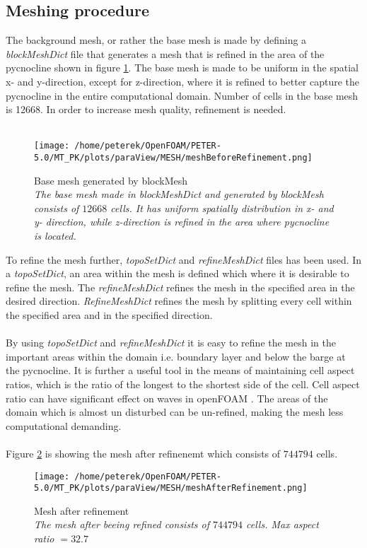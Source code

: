 \documentclass[a4paper, 12pt]{report}
\begin{document}
\subsection{Meshing procedure}
The background mesh, or rather the base mesh is made by defining a \textit{blockMeshDict} file that generates a mesh that is refined in the area of the pycnocline shown in figure \ref{fig:baseMesh}. The base mesh is made to be uniform in the spatial x- and y-direction, except for z-direction, where it is refined to better capture the pycnocline in the entire computational domain. Number of cells in the base mesh is 12668. In order to increase mesh quality, refinement is needed.\\
\\
\begin{figure}[H]
	\centering
	\texttt{[image: /home/peterek/OpenFOAM/PETER-5.0/MT\_PK/plots/paraView/MESH/meshBeforeRefinement.png]}
	\caption{Base mesh generated by blockMesh\\ \textit{The base mesh made in blockMeshDict and generated by blockMesh consists of $12668$ cells. It has uniform spatially distribution in x- and y- direction, while z-direction is refined in the area where pycnocline is located.}}
	\label{fig:baseMesh}
\end{figure}

To refine the mesh further, \textit{topoSetDict} and \textit{refineMeshDict} files has been used. In a \textit{topoSetDict}, an area within the mesh is defined which where it is desirable to refine the mesh. The \textit{refineMeshDict} refines the mesh in the specified area in the desired direction. \textit{RefineMeshDict} refines the mesh by splitting every cell within the specified area and in the specified direction.\\
\\
By using \textit{topoSetDict} and \textit{refineMeshDict} it is easy to refine the mesh in the important areas within the domain i.e. boundary layer and below the barge at the pycnocline. It is further a useful tool in the means of maintaining cell aspect ratios, which is the ratio of the longest to the shortest side of the cell. Cell aspect ratio can have significant effect on waves in openFOAM \cite{Roenby}. The areas of the domain which is almost un disturbed can be un-refined, making the mesh less computational demanding.\\
\\
Figure \ref{fig:RefinedMesh} is showing the mesh after refinenemt which consists of $744794$ cells. 
\begin{figure}[H]
	\centering
	\texttt{[image: /home/peterek/OpenFOAM/PETER-5.0/MT\_PK/plots/paraView/MESH/meshAfterRefinement.png]}
	\caption{Mesh after refinement\\ \textit{The mesh after beeing refined consists of $744794$ cells. Max aspect ratio $= 32.7$  }}
	\label{fig:RefinedMesh}
\end{figure}
\end{document}

